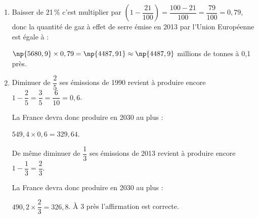 
\medskip

%

\begin{enumerate}
\item %


Baisser de 21\,\% c'est multiplier par $\left(1 - \dfrac{21}{100}  \right) = \dfrac{100 - 21}{100} = \dfrac{79}{100} = 0,79$, donc la quantité de gaz à effet de serre émise en 2013 par l'Union Européenne est égale à :

$\np{5680,9} \times 0,79 = \np{4487,91} \approx \np{4487,9}$ millions de tonnes à 0,1 près.
\item  %

Diminuer de $\dfrac{2}{5}$ ses émissions de 1990 revient à produire encore $1 - \dfrac{2}{5} =  \dfrac{3}{5} =  \dfrac{6}{10} = 0,6$.

La France devra donc produire en 2030 au plus :

$549,4 \times 0,6 = 329,64$.

De même diminuer de $\dfrac{1}{3}$ ses émissions de 2013 revient à produire encore $1 - \dfrac{1}{3} =  \dfrac{2}{3}$.

La France devra donc produire en 2030 au plus :

$490,2 \times \dfrac{2}{3} = 326,8$. À 3 près l'affirmation est correcte.
\end{enumerate}

\bigskip


